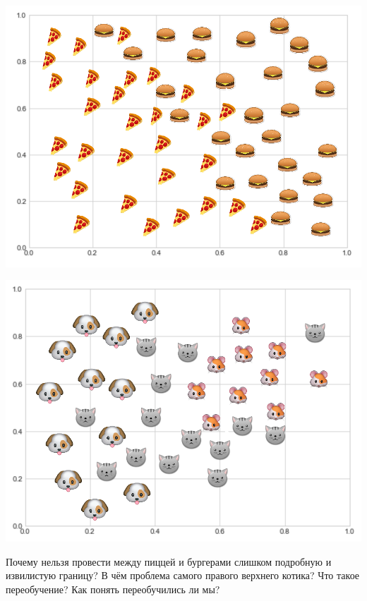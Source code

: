 \documentclass[12pt, a4paper, oneside]{article}
\begin{document}
\begin{minipage}[t]{0.45\textwidth}
	\includegraphics[scale=0.21]{class_1.png}
\end{minipage}
\hfill
\begin{minipage}[t]{0.45\textwidth}
	\includegraphics[scale=0.21]{class_2.png}
\end{minipage}

Почему нельзя провести между пиццей и бургерами слишком подробную и извилистую границу? В чём проблема самого правого верхнего котика? Что такое переобучение?  Как понять переобучились ли мы? 
\end{document}
